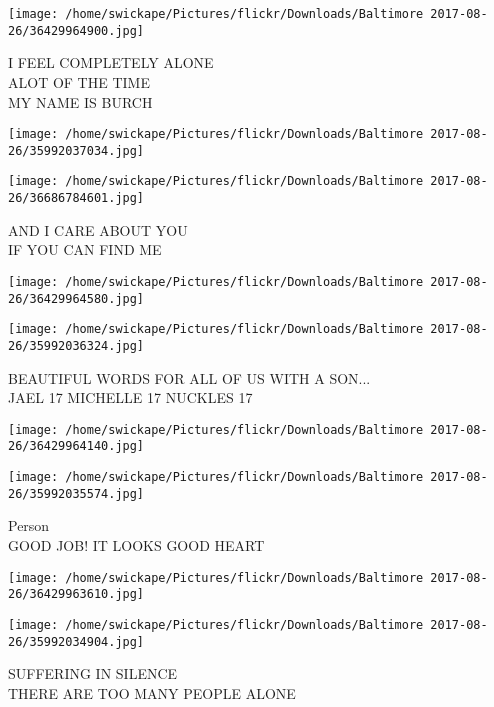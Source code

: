 \documentclass[10pt,letterpaper]{article}
\begin{document}
\vspace{0.25in}
\texttt{[image: /home/swickape/Pictures/flickr/Downloads/Baltimore 2017-08-26/36429964900.jpg]}

I FEEL COMPLETELY ALONE\\
ALOT OF THE TIME\\
MY NAME IS BURCH\\
\pagebreak

\texttt{[image: /home/swickape/Pictures/flickr/Downloads/Baltimore 2017-08-26/35992037034.jpg]}

\vspace{0.25in}
\texttt{[image: /home/swickape/Pictures/flickr/Downloads/Baltimore 2017-08-26/36686784601.jpg]}

AND I CARE ABOUT YOU\\
IF YOU CAN FIND ME\\
\pagebreak

\texttt{[image: /home/swickape/Pictures/flickr/Downloads/Baltimore 2017-08-26/36429964580.jpg]}

\vspace{0.25in}
\texttt{[image: /home/swickape/Pictures/flickr/Downloads/Baltimore 2017-08-26/35992036324.jpg]}

BEAUTIFUL WORDS FOR ALL OF US WITH A SON...\\
JAEL 17 MICHELLE 17 NUCKLES 17\\
\pagebreak

\texttt{[image: /home/swickape/Pictures/flickr/Downloads/Baltimore 2017-08-26/36429964140.jpg]}

\vspace{0.25in}
\texttt{[image: /home/swickape/Pictures/flickr/Downloads/Baltimore 2017-08-26/35992035574.jpg]}

Person\\
GOOD JOB!  IT LOOKS GOOD HEART\\
\pagebreak

\texttt{[image: /home/swickape/Pictures/flickr/Downloads/Baltimore 2017-08-26/36429963610.jpg]}

\vspace{0.25in}
\texttt{[image: /home/swickape/Pictures/flickr/Downloads/Baltimore 2017-08-26/35992034904.jpg]}

SUFFERING IN SILENCE\\
THERE ARE TOO MANY PEOPLE ALONE\\
\pagebreak
\end{document}
